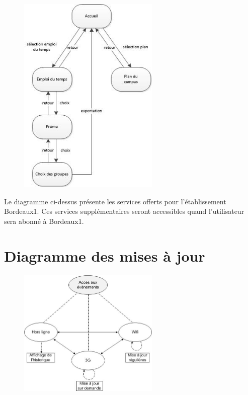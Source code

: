 \documentclass [pdftex,12pt] {report}
\begin{document}
\begin{figure}[h]
	\center
	\includegraphics[width=0.6\textwidth]{resources/features2.jpg}
\end{figure}

Le diagramme ci-dessus présente les services offerts pour l'établissement Bordeaux1. Ces services supplémentaires seront accessibles quand l'utilisateur sera abonné à Bordeaux1.

\section{Diagramme des mises à jour}

\begin{figure}[h]
  \center
  \includegraphics[width=0.6\textwidth]{resources/state_diagram.jpg}
\end{figure}
\end{document}
